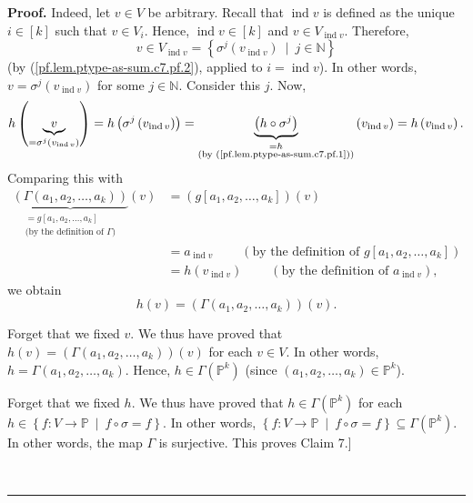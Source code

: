 \documentclass[numbers=enddot,12pt,final,onecolumn,notitlepage]{scrartcl}%
\numberwithin{exer}{section}
\theoremstyle{definition}
\newenvironment{proof}[1][Proof]{\noindent\textbf{#1.} }{\ \rule{0.5em}{0.5em}}
\newenvironment{verlong}{}{}
\begin{document}
\begin{verlong}
\begin{proof}
Indeed, let $v\in V$ be arbitrary. Recall that $\operatorname*{ind}v$ is
defined as the unique $i\in\left[  k\right]  $ such that $v\in V_{i}$. Hence,
$\operatorname*{ind}v\in\left[  k\right]  $ and $v\in V_{\operatorname*{ind}%
v}$. Therefore,%
\[
v\in V_{\operatorname*{ind}v}=\left\{  \sigma^{j}\left(
v_{\operatorname*{ind}v}\right)  \ \mid\ j\in\mathbb{N}\right\}
\]
(by (\ref{pf.lem.ptype-as-sum.c7.pf.2}), applied to $i=\operatorname*{ind}v$).
In other words, $v=\sigma^{j}\left(  v_{\operatorname*{ind}v}\right)  $ for
some $j\in\mathbb{N}$. Consider this $j$. Now,%
\[
h\left(  \underbrace{v}_{=\sigma^{j}\left(  v_{\operatorname*{ind}v}\right)
}\right)  =h\left(  \sigma^{j}\left(  v_{\operatorname*{ind}v}\right)
\right)  =\underbrace{\left(  h\circ\sigma^{j}\right)  }%
_{\substack{=h\\\text{(by (\ref{pf.lem.ptype-as-sum.c7.pf.1}))}}}\left(
v_{\operatorname*{ind}v}\right)  =h\left(  v_{\operatorname*{ind}v}\right)  .
\]
Comparing this with%
\begin{align*}
\underbrace{\left(  \Gamma\left(  a_{1},a_{2},\ldots,a_{k}\right)  \right)
}_{\substack{=g\left[  a_{1},a_{2},\ldots,a_{k}\right]  \\\text{(by the
definition of }\Gamma\text{)}}}\left(  v\right)   &  =\left(  g\left[
a_{1},a_{2},\ldots,a_{k}\right]  \right)  \left(  v\right) \\
&  =a_{\operatorname*{ind}v}\ \ \ \ \ \ \ \ \ \ \left(  \text{by the
definition of }g\left[  a_{1},a_{2},\ldots,a_{k}\right]  \right) \\
&  =h\left(  v_{\operatorname*{ind}v}\right)  \ \ \ \ \ \ \ \ \ \ \left(
\text{by the definition of }a_{\operatorname*{ind}v}\right)  ,
\end{align*}
we obtain%
\[
h\left(  v\right)  =\left(  \Gamma\left(  a_{1},a_{2},\ldots,a_{k}\right)
\right)  \left(  v\right)  .
\]


Forget that we fixed $v$. We thus have proved that $h\left(  v\right)
=\left(  \Gamma\left(  a_{1},a_{2},\ldots,a_{k}\right)  \right)  \left(
v\right)  $ for each $v\in V$. In other words, $h=\Gamma\left(  a_{1}%
,a_{2},\ldots,a_{k}\right)  $. Hence, $h\in\Gamma\left(  \mathbb{P}%
^{k}\right)  $ (since $\left(  a_{1},a_{2},\ldots,a_{k}\right)  \in
\mathbb{P}^{k}$).

Forget that we fixed $h$. We thus have proved that $h\in\Gamma\left(
\mathbb{P}^{k}\right)  $ for each $h\in\left\{  f:V\rightarrow\mathbb{P}%
\ \mid\ f\circ\sigma=f\right\}  $. In other words, $\left\{  f:V\rightarrow
\mathbb{P}\ \mid\ f\circ\sigma=f\right\}  \subseteq\Gamma\left(
\mathbb{P}^{k}\right)  $. In other words, the map $\Gamma$ is surjective. This
proves Claim 7.] \medskip


\end{proof}
\end{verlong}
\end{document}
